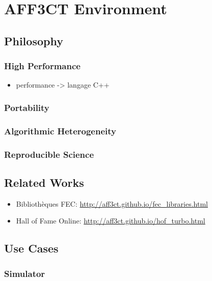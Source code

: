 \chapter{AFF3CT Environment}

\section{Philosophy~\cite{Cassagne2019a}}

\subsection{High Performance}

\begin{itemize}
  \item performance -> langage C++
\end{itemize}

\subsection{Portability}

\subsection{Algorithmic Heterogeneity}

\subsection{Reproducible Science}

\section{Related Works}

\begin{itemize}
  \item Bibliothèques FEC: \url{http://aff3ct.github.io/fec_libraries.html}
  \item Hall of Fame Online: \url{http://aff3ct.github.io/hof_turbo.html}
\end{itemize}

\section{Use Cases}

\subsection{Simulator~\cite{Cassagne2017,Cassagne2017a}}

